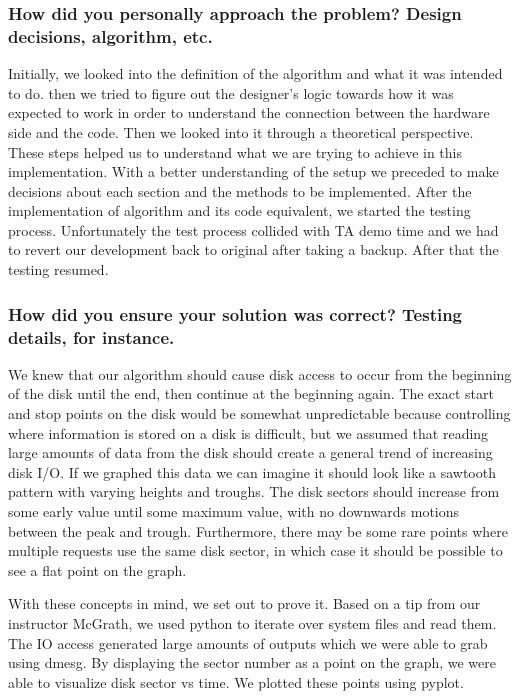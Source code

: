 \documentclass[journal,10pt,onecolumn,compsoc,letterpaper,draftclsnofoot,table,xcdraw]{IEEEtran} \usepackage[margin=0.75in]{geometry}
\begin{document}
\subsubsection{How did you personally approach the problem? Design decisions, algorithm, etc.}
\noindent Initially, we looked into the definition of the algorithm and what it was intended to do. then we tried to figure out the designer's logic towards how it was expected to work in order to understand the connection between the hardware side and the code. Then we looked into it through a theoretical perspective. These steps helped us to understand what we are trying to achieve in this implementation. With  a better understanding of the setup we preceded to make decisions about each section and the methods to be implemented. After the implementation of algorithm and its code equivalent, we started the testing process. Unfortunately the test process collided with TA demo time and we had to revert our development back to original after taking a backup. After that the testing resumed.

\subsubsection{How did you ensure your solution was correct? Testing details, for instance.}
\noindent We knew that our algorithm should cause disk access to occur from the beginning of the disk until the end, then continue at the beginning again.  The exact start and stop points on the disk would be somewhat unpredictable because controlling where information is stored on a disk is difficult, but we assumed that reading large amounts of data from the disk should create a general trend of increasing disk I/O.  If we graphed this data we can imagine it should look like a sawtooth pattern with varying heights and troughs.  The disk sectors should increase from some early value until some maximum value, with no downwards motions between the peak and trough.  Furthermore, there may be some rare points where multiple requests use the same disk sector, in which case it should be possible to see a flat point on the graph.

\noindent With these concepts in mind, we set out to prove it. Based on a tip from our instructor McGrath, we used python to iterate over system files and read them. The IO access generated large amounts of outputs which we were able to grab using dmesg. By displaying the sector number as a point on the graph, we were able to visualize disk sector vs time. We plotted these points using pyplot.
\end{document}
